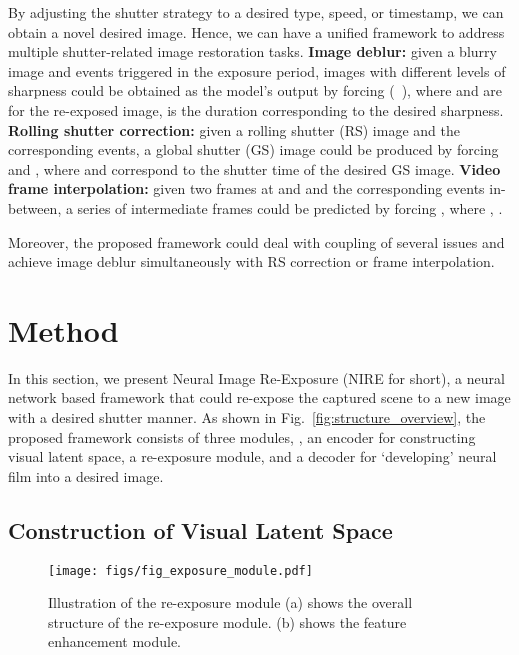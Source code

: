 \documentclass[10pt,twocolumn,letterpaper]{article}
\begin{document}
By adjusting the shutter strategy to a desired type, speed, or timestamp, we can obtain a novel desired image.
Hence, we can have a unified framework to address multiple shutter-related image restoration tasks.
{\flushleft\textbf{Image deblur:}} given a blurry image and events triggered in the exposure period, images with different levels of sharpness could be obtained as the model's output by forcing 
 (\eg ~), 
where  and  are for the re-exposed image,  is the duration corresponding to the desired sharpness.
{\flushleft\textbf{Rolling shutter correction:}} given a rolling shutter (RS) image and the corresponding events, a global shutter (GS) image could be produced by forcing  and , where  and  correspond to the shutter time of the desired GS image.
{\flushleft\textbf{Video frame interpolation:}} given two frames at  and  and the corresponding events in-between, a series of intermediate frames could be predicted by forcing  , where , .


Moreover, the proposed framework could deal with coupling of several issues and achieve image deblur simultaneously with RS correction or frame interpolation.



 
\section{Method}

In this section, we present Neural Image Re-Exposure (NIRE for short), 
a neural network based framework that could re-expose the captured scene to a new image with a desired shutter manner.
As shown in Fig.~\ref{fig:structure_overview}, the proposed framework consists of three modules, \ie, an encoder for constructing visual latent space, a re-exposure module, and a decoder for `developing' neural film into a desired image.

\subsection{Construction of Visual Latent Space}
\label{sec:Construction of Visual Latent Space}

\begin{figure*}[h!]
\centering
\texttt{[image: figs/fig\_exposure\_module.pdf]}
\caption{Illustration of the re-exposure module
(a) shows the overall structure of the re-exposure module.
(b) shows the feature enhancement module.
}
\label{fig:exposing_simulation}
\vspace{-1.0em}
\end{figure*}
\end{document}
